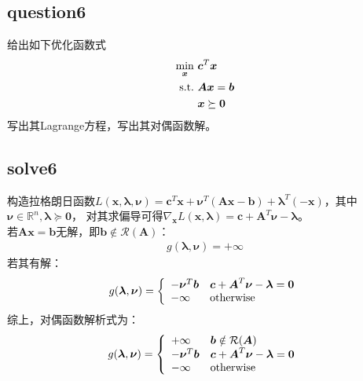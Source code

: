 \documentclass[12pt,a4paper]{ctexart}
\begin{document}
\subsection*{question6}
给出如下优化函数式
\begin{align*}
    \min\limits_{\boldsymbol{x}} \ &\boldsymbol{c}^T\boldsymbol{x} \\
    \rm{s.t.}\  &\boldsymbol{Ax}=\boldsymbol{b}\\
                & \boldsymbol{x} \succeq \boldsymbol{0}
\end{align*}
写出其Lagrange方程，写出其对偶函数解。

\subsection*{solve6}
构造拉格朗日函数$L(\boldsymbol{x},\boldsymbol{\lambda},\boldsymbol{\nu})=
\boldsymbol{c}^T\boldsymbol{x}+\boldsymbol{\nu}^T(\boldsymbol{Ax}-\boldsymbol{b})+\boldsymbol{\lambda}^T(-\boldsymbol{x})$，其中$\boldsymbol{\nu} \in \mathbb{R}^n,\boldsymbol{\lambda} \succeq \boldsymbol{0}$，
对其求偏导可得$\nabla_{\boldsymbol{x}} L(\boldsymbol{x},\boldsymbol{\lambda})=\boldsymbol{c}+\boldsymbol{ A}^T \boldsymbol{\nu}-\boldsymbol{\lambda}$。\\
若$\boldsymbol{Ax}=\boldsymbol{b}$无解，即$\boldsymbol{b} \notin \mathcal{R}(\boldsymbol{A})$：
\begin{align*}
g(\boldsymbol{\lambda},\boldsymbol{\nu})=+\infty
\end{align*}
若其有解：
\begin{align*}
    g(\boldsymbol{\lambda},\boldsymbol{\nu})=\left \{
    \begin{array}{ll}
    -\boldsymbol{\nu}^T \boldsymbol{b} &\boldsymbol{c}+\boldsymbol{ A}^T \boldsymbol{\nu}-\boldsymbol{\lambda}=\boldsymbol{0}\\
    -\infty &\rm{otherwise}
    \end{array}
    \right.
\end{align*}
综上，对偶函数解析式为：
\begin{align*}
    g(\boldsymbol{\lambda},\boldsymbol{\nu})=\left \{
    \begin{array}{ll}
    +\infty &\boldsymbol{b} \notin \mathcal{R}(\boldsymbol{A})\\
    -\boldsymbol{\nu}^T \boldsymbol{b} &\boldsymbol{c}+\boldsymbol{ A}^T \boldsymbol{\nu}-\boldsymbol{\lambda}=\boldsymbol{0}\\
    -\infty &\rm{otherwise}
    \end{array}
    \right.
\end{align*}
\end{document}
